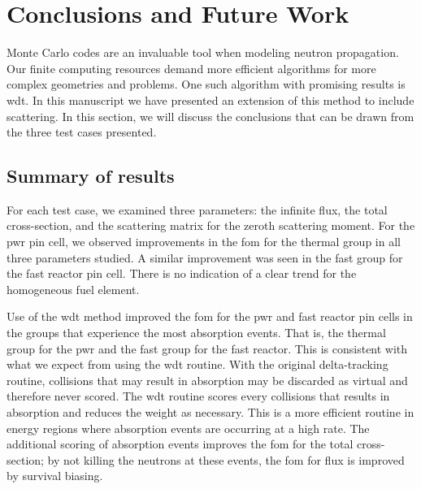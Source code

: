 
\chapter{Conclusions and Future Work}
\label{chap:conclusion}

Monte Carlo codes are an invaluable tool when modeling neutron
propagation. Our finite computing resources demand more efficient
algorithms for more complex geometries and problems. One such
algorithm with promising results is \gls{wdt}.  In this manuscript we
have presented an extension of this method to include scattering.  In
this section, we will discuss the conclusions that can be drawn from
the three test cases presented.

\section{Summary of results}
\label{sec:results_summary}

For each test case, we examined three parameters: the infinite flux,
the total cross-section, and the scattering matrix for the zeroth
scattering moment. For the \gls{pwr} pin cell, we observed
improvements in the \gls{fom} for the thermal group in all three
parameters studied. A similar improvement was seen in the fast group
for the fast reactor pin cell. There is no indication of a clear trend
for the homogeneous fuel element.

Use of the \gls{wdt} method improved the \gls{fom} for the \gls{pwr}
and fast reactor pin cells in the groups that experience the most
absorption events. That is, the thermal group for the \gls{pwr} and
the fast group for the fast reactor. This is consistent with what we
expect from using the \gls{wdt} routine. With the original
delta-tracking routine, collisions that may result in absorption may
be discarded as virtual and therefore never scored. The \gls{wdt}
routine scores every collisions that results in absorption and reduces
the weight as necessary. This is a more efficient routine in energy
regions where absorption events are occurring at a high rate. The
additional scoring of absorption events improves the \gls{fom} for the
total cross-section; by not killing the neutrons at these events, the
\gls{fom} for flux is improved by survival biasing. 

